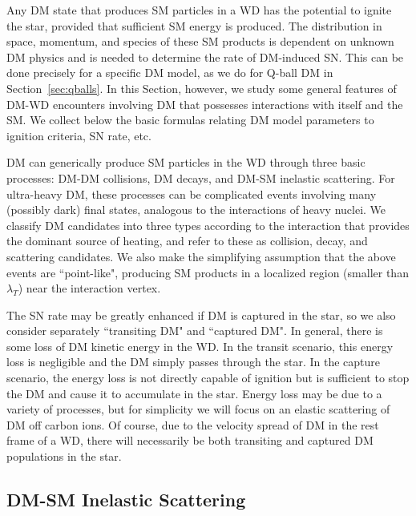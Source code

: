 Any DM state that produces SM particles in a WD has the potential to ignite the star, provided that sufficient SM energy is produced. 
The distribution in space, momentum, and species of these SM products is dependent on unknown DM physics and is needed to determine the rate of DM-induced SN. 
This can be done precisely for a specific DM model, as we do for Q-ball DM in Section~\ref{sec:qballs}.
In this Section, however, we study some general features of DM-WD encounters involving DM that possesses interactions with itself and the SM. 
We collect below the basic formulas relating DM model parameters to ignition criteria, SN rate, etc. 

DM can generically produce SM particles in the WD through three basic processes: DM-DM collisions, DM decays, and DM-SM inelastic scattering.
For ultra-heavy DM, these processes can be complicated events involving many (possibly dark) final states, analogous to the interactions of heavy nuclei.
We classify DM candidates into three types according to the interaction that provides the dominant source of heating, and refer to these as collision, decay, and scattering candidates.
We also make the simplifying assumption that the above events are ``point-like", producing SM products in a localized region (smaller than $\lambda_T$) near the interaction vertex.

The SN rate may be greatly enhanced if DM is captured in the star, so we also consider separately ``transiting DM" and ``captured DM". 
In general, there is some loss of DM kinetic energy in the WD. 
In the transit scenario, this energy loss is negligible and the DM simply passes through the star.
In the capture scenario, the energy loss is not directly capable of ignition but is sufficient to stop the DM and cause it to accumulate in the star.
Energy loss may be due to a variety of processes, but for simplicity we will focus on an elastic scattering of DM off carbon ions. 
Of course, due to the velocity spread of DM in the rest frame of a WD, there will necessarily be both transiting and captured DM populations in the star. 

\subsection{DM-SM Inelastic Scattering}

